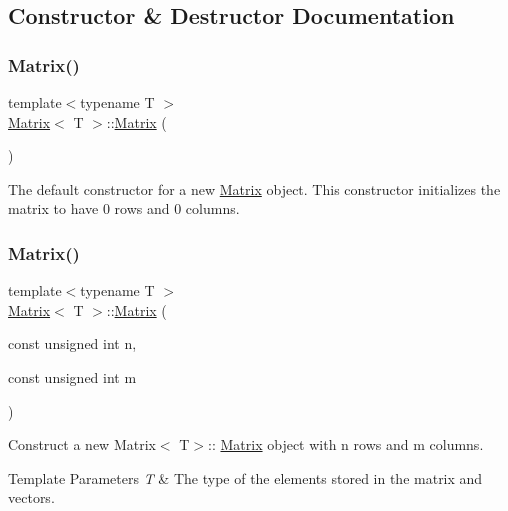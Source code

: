 \subsection{Constructor \& Destructor Documentation}
\mbox{\label{classMatrix_a9d567e3a121b1be0c3f9c461cab524fe}} 
\subsubsection{\texorpdfstring{Matrix()}{Matrix()}\hspace{0.1cm}{\footnotesize\ttfamily [1/7]}}
{\footnotesize\ttfamily template$<$typename T $>$ \\
\mbox{\hyperlink{classMatrix}{Matrix}}$<$ T $>$\+::\mbox{\hyperlink{classMatrix}{Matrix}} (\begin{DoxyParamCaption}{ }\end{DoxyParamCaption})}



The default constructor for a new \mbox{\hyperlink{classMatrix}{Matrix}} object. This constructor initializes the matrix to have 0 rows and 0 columns. 

\mbox{\label{classMatrix_ac8061527f81abb94e19b1ac6fd4af63a}} 
\subsubsection{\texorpdfstring{Matrix()}{Matrix()}\hspace{0.1cm}{\footnotesize\ttfamily [2/7]}}
{\footnotesize\ttfamily template$<$typename T $>$ \\
\mbox{\hyperlink{classMatrix}{Matrix}}$<$ T $>$\+::\mbox{\hyperlink{classMatrix}{Matrix}} (\begin{DoxyParamCaption}\item[{const unsigned int}]{n,  }\item[{const unsigned int}]{m }\end{DoxyParamCaption})}



Construct a new Matrix$<$ T$>$\+:\+: \mbox{\hyperlink{classMatrix}{Matrix}} object with {\ttfamily n} rows and {\ttfamily m} columns. 


\begin{DoxyTemplParams}{Template Parameters}
{\em T} & The type of the elements stored in the matrix and vectors. \\
\hline
\end{DoxyTemplParams}

